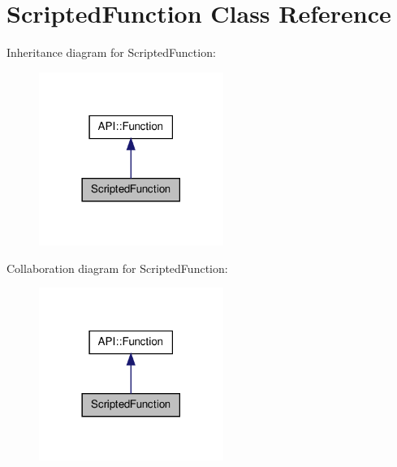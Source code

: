 \hypertarget{class_scripted_function}{\section{Scripted\-Function Class Reference}
\label{class_scripted_function}
}


Inheritance diagram for Scripted\-Function\-:
\nopagebreak
\begin{figure}[H]
\begin{center}
\leavevmode
\includegraphics[width=170pt]{class_scripted_function__inherit__graph}
\end{center}
\end{figure}


Collaboration diagram for Scripted\-Function\-:
\nopagebreak
\begin{figure}[H]
\begin{center}
\leavevmode
\includegraphics[width=170pt]{class_scripted_function__coll__graph}
\end{center}
\end{figure}
